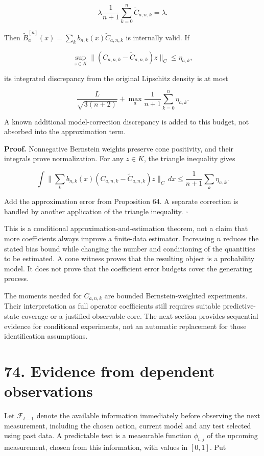 \documentclass[11pt,letterpaper]{article}
\begin{document}
\[
\lambda\frac1{n+1}\sum_{k=0}^n\widetilde C_{a,n,k}=\lambda.
\]

Then \(\widetilde B_a^{[n]}(x)=\sum_k b_{n,k}(x)\widetilde C_{a,n,k}\)
is internally valid. If

\[
\sup_{z\in K}\|(C_{a,n,k}-\widetilde C_{a,n,k})z\|_C
\leq\eta_{a,k},
\]

its integrated discrepancy from the original Lipschitz density is at
most

\[
\boxed{
\frac{L}{\sqrt{3(n+2)}}+
\max_a\frac1{n+1}\sum_{k=0}^n\eta_{a,k}.
}
\]

A known additional model-correction discrepancy is added to this budget,
not absorbed into the approximation term.

\textbf{Proof.} Nonnegative Bernstein weights preserve cone positivity,
and their integrals prove normalization. For any \(z\in K\), the
triangle inequality gives

\[
\int\|\textstyle\sum_k b_{n,k}(x)(C_{a,n,k}-\widetilde C_{a,n,k})z\|_C\,dx
\leq\frac1{n+1}\sum_k\eta_{a,k}.
\]

Add the approximation error from Proposition 64. A separate correction
is handled by another application of the triangle inequality.
\(\square\)

This is a conditional approximation-and-estimation theorem, not a claim
that more coefficients always improve a finite-data estimator.
Increasing \(n\) reduces the stated bias bound while changing the number
and conditioning of the quantities to be estimated. A cone witness
proves that the resulting object is a probability model. It does not
prove that the coefficient error budgets cover the generating process.

The moments needed for \(C_{a,n,k}\) are bounded Bernstein-weighted
experiments. Their interpretation as full operator coefficients still
requires suitable predictive-state coverage or a justified observable
core. The next section provides sequential evidence for conditional
experiments, not an automatic replacement for those identification
assumptions.

\section{74. Evidence from dependent
observations}\label{evidence-from-dependent-observations}

Let \(\mathcal F_{t-1}\) denote the available information immediately
before observing the next measurement, including the chosen action,
current model and any test selected using past data. A predictable test
is a measurable function \(\phi_{t,j}\) of the upcoming measurement,
chosen from this information, with values in \([0,1]\). Put
\end{document}
